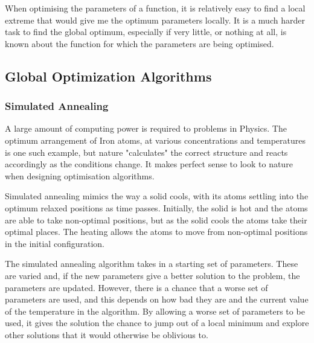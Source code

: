 When optimising the parameters of a function, it is relatively easy to find a local extreme that would give me the optimum parameters locally.  It is a much harder task to find the global optimum, especially if very little, or nothing at all, is known about the function for which the parameters are being optimised.



\subsection{Global Optimization Algorithms}


\subsubsection{Simulated Annealing}

A large amount of computing power is required to problems in Physics.  The optimum arrangement of Iron atoms, at various concentrations and temperatures is one such example, but nature "calculates" the correct structure and reacts accordingly as the conditions change.  It makes perfect sense to look to nature when designing optimisation algorithms.

Simulated annealing mimics the way a solid cools, with its atoms settling into the optimum relaxed positions as time passes.  Initially, the solid is hot and the atoms are able to take non-optimal positions, but as the solid cools the atoms take their optimal places.  The heating allows the atoms to move from non-optimal positions in the initial configuration.

The simulated annealing algorithm takes in a starting set of parameters.  These are varied and, if the new parameters give a better solution to the problem, the parameters are updated.  However, there is a chance that a worse set of parameters are used, and this depends on how bad they are and the current value of the temperature in the algorithm.  By allowing a worse set of parameters to be used, it gives the solution the chance to jump out of a local minimum and explore other solutions that it would otherwise be oblivious to.


